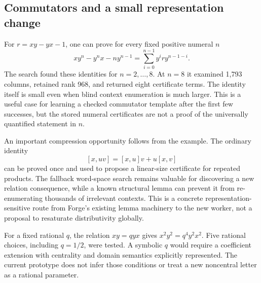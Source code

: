 \documentclass[11pt,letterpaper]{article}
\theoremstyle{definition}\newtheorem{definition}[theorem]{Definition}
\theoremstyle{remark}\newtheorem{remark}[theorem]{Remark}
\begin{document}
\subsection{Commutators and a small representation change}
For $r=xy-yx-1$, one can prove for every fixed positive numeral $n$
\begin{equation}
 xy^n-y^n x-ny^{n-1}
   =\sum_{i=0}^{n-1}y^i r y^{n-1-i}.
 \label{eq:weyl}
\end{equation}
The search found these identities for $n=2,\ldots,8$. At $n=8$ it examined
1,793 columns, retained rank 968, and returned eight certificate terms. The
identity itself is small even when blind context enumeration is much larger.
This is a useful case for learning a checked commutator template after the first
few successes, but the stored numeral certificates are not a proof of the
universally quantified statement in $n$.

An important compression opportunity follows from the example. The ordinary
identity
\[
 [x,uv]=[x,u]v+u[x,v]
\]
can be proved once and used to propose a linear-size certificate for repeated
products. The fallback word-space search remains valuable for discovering a
new relation consequence, while a known structural lemma can prevent it from
re-enumerating thousands of irrelevant contexts. This is a concrete
representation-sensitive route from Forge's existing lemma machinery to the
new worker, not a proposal to resaturate distributivity globally.

For a fixed rational $q$, the relation $xy=qyx$ gives
$x^2y^2=q^4y^2x^2$. Five rational choices, including $q=1/2$, were tested. A
symbolic $q$ would require a coefficient extension with centrality and domain
semantics explicitly represented. The current prototype does not infer those
conditions or treat a new noncentral letter as a rational parameter.
\end{document}
